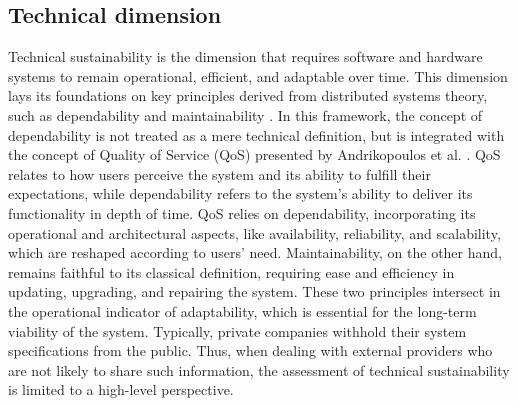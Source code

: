 \subsection{Technical dimension}
Technical sustainability is the dimension that requires software and hardware systems to remain operational, efficient, and adaptable over time. This dimension lays its foundations on key principles derived from distributed systems theory, such as dependability and maintainability \cite{tanenbaum_distributed_2006}. In this framework, the concept of dependability is not treated as a mere technical definition, but is integrated with the concept of Quality of Service (QoS) presented by Andrikopoulos et al. \cite{andrikopoulos_software_2021}. QoS relates to how users perceive the system and its ability to fulfill their expectations, while dependability refers to the system's ability to deliver its functionality in depth of time. QoS relies on dependability, incorporating its operational and architectural aspects, like availability, reliability, and scalability, which are reshaped according to users' need. Maintainability, on the other hand, remains faithful to its classical definition, requiring ease and efficiency in updating, upgrading, and repairing the system. These two principles intersect in the operational indicator of adaptability, which is essential for the long-term viability of the system. Typically, private companies withhold their system specifications from the public. Thus, when dealing with external providers who are not likely to share such information, the assessment of technical sustainability is limited to a high-level perspective.    

